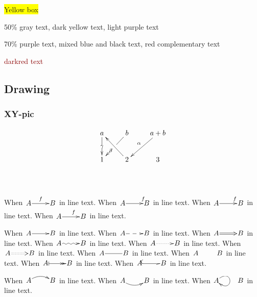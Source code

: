 
\colorbox{yellow}{Yellow box}


\textcolor[gray]{0.5}{50\% gray text}, \textcolor[rgb]{0.6, 0.6, 0}{dark yellow text}, \textcolor[cmyk]{0.6, 0.6, 0, 0}{light purple text}

\textcolor{purple!70}{70\% purple text}, \textcolor{blue!60!black}{mixed blue and black text}, \textcolor{-red}{red complementary text}

\textcolor{darkred}{darkred text}       %

\subsection{Drawing}
\subsubsection{XY-pic}
\begin{equation}
    \begin{gathered}
        \xymatrix{
            a & b & a+b \ar[ld]_{\alpha} \\
            1 & 2 \ar"1,1"^{\beta} & 3 \\
            \ar"1,1";"2,1"|{\gamma}
            \ar"1,2";"2,1"|\hole
        }
    \end{gathered}
\end{equation}

When $\xymatrix@1{A \ar[r]^{f} & B}$ in line text.
When $\xymatrix@1{A \ar[r]^>{f} & B}$ in line text.
When $\xymatrix@1{A \ar[r]^>>{f} & B}$ in line text.
When $\xymatrix@1{A \ar[r]^(0.6){f} & B}$ in line text.

When $\xymatrix@1{A \ar@{->}[r] & B}$ in line text.
When $\xymatrix@1{A \ar@{-->}[r] & B}$ in line text.
When $\xymatrix@1{A \ar@{=>}[r] & B}$ in line text.
When $\xymatrix@1{A \ar@{~>}[r] & B}$ in line text.
When $\xymatrix@1{A \ar@{.>}[r] & B}$ in line text.
When $\xymatrix@1{A \ar@{:>}[r] & B}$ in line text.
When $\xymatrix@1{A \ar@{-}[r] & B}$ in line text.
When $\xymatrix@1{A \ar@{}[r] & B}$ in line text.
When $\xymatrix@1{A \ar@{|->>}[r] & B}$ in line text.
When $\xymatrix@1{A \ar@{^(-_>}[r] & B}$ in line text.

When $\xymatrix@1{A \ar@/^/[r] & B}$ in line text.
When $\xymatrix@1{A \ar@/_/[r] & B}$ in line text.
When $\xymatrix@1{A \ar@(ur,dr) & B}$ in line text.

